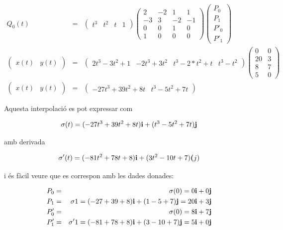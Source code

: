\begin{enumerate}
\begin{eqnarray*}
  Q_0(t)&=&\begin{pmatrix}t^3 & t^2 & t & 1\end{pmatrix}
  \begin{pmatrix}
    2 & -2 & 1 & 1 \\
    -3 & 3 & -2 & -1 \\
    0 & 0 & 1 & 0 \\
    1 & 0 & 0 & 0
\end{pmatrix}
  \begin{pmatrix}
      P_0 \\
      P_1 \\
      P'_0 \\
      P'_1
  \end{pmatrix}\\
  \begin{pmatrix}
    x(t)&
    y(t)
  \end{pmatrix}&=&
  \begin{pmatrix}2t^3-3t^2+1 & -2t^3+3t^2&  t^3-2*t^2+t&t^3-t^2\end{pmatrix}
  \begin{pmatrix}
      0 &0 \\
      20 & 3\\
      8 & 7 \\
      5 & 0
  \end{pmatrix}\\
  \begin{pmatrix}
    x(t)&
    y(t)
  \end{pmatrix}&=&
  \begin{pmatrix}
    -27 t^3 +39 t^2 +8t&
    t^3-5t^2+7t
  \end{pmatrix}
\end{eqnarray*}

Aquesta interpolació es pot expressar com 

\[
\sigma(t)= (-27 t^3 +39 t^2 +8t) \textbf{i} +  (t^3-5t^2+7t)  \textbf{j}
\]

amb derivada

\[
\sigma'(t) = (-81t^2 + 78 t +8) \textbf{i} + (3t^2-10t+7) \textbf{(}j)  
\]

i és fàcil veure que es correspon amb les dades donades:

\begin{eqnarray*}
  P_0&=&\sigma(0) = 0 \textbf{i} + 0 \textbf{j}\\
  P_1&=&\sigma{1} = (-27+39+8) \textbf{i} + (1-5+7) \textbf{j} = 20 \textbf{i} + 3 \textbf{j}\\
  P'_0&=&\sigma(0) = 8 \textbf{i} + 7 \textbf{j}\\
  P'_1&=&\sigma'{1} = (-81+78+8) \textbf{i} + (3-10+7) \textbf{j} = 5 \textbf{i} + 0 \textbf{j}
\end{eqnarray*}


\end{enumerate}
